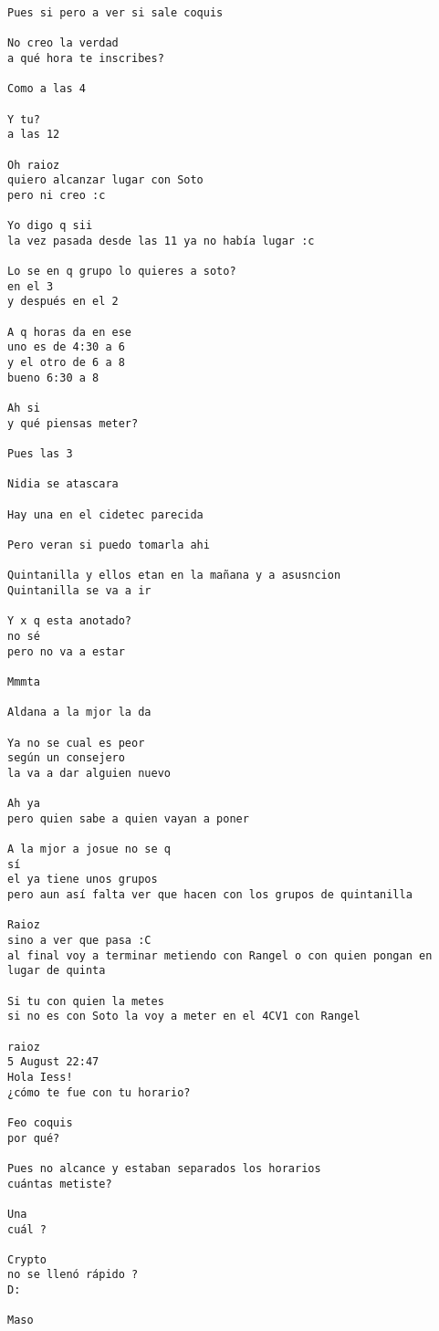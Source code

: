 \begin{verbatim}
Pues si pero a ver si sale coquis

No creo la verdad
a qué hora te inscribes?

Como a las 4

Y tu?
a las 12

Oh raioz
quiero alcanzar lugar con Soto
pero ni creo :c

Yo digo q sii
la vez pasada desde las 11 ya no había lugar :c

Lo se en q grupo lo quieres a soto?
en el 3
y después en el 2

A q horas da en ese
uno es de 4:30 a 6
y el otro de 6 a 8
bueno 6:30 a 8

Ah si
y qué piensas meter?

Pues las 3

Nidia se atascara

Hay una en el cidetec parecida

Pero veran si puedo tomarla ahi

Quintanilla y ellos etan en la mañana y a asusncion
Quintanilla se va a ir

Y x q esta anotado?
no sé
pero no va a estar

Mmmta

Aldana a la mjor la da

Ya no se cual es peor
según un consejero
la va a dar alguien nuevo

Ah ya
pero quien sabe a quien vayan a poner

A la mjor a josue no se q
sí
el ya tiene unos grupos
pero aun así falta ver que hacen con los grupos de quintanilla

Raioz
sino a ver que pasa :C
al final voy a terminar metiendo con Rangel o con quien pongan en lugar de quinta

Si tu con quien la metes
si no es con Soto la voy a meter en el 4CV1 con Rangel

raioz
5 August 22:47
Hola Iess!
¿cómo te fue con tu horario?

Feo coquis
por qué?

Pues no alcance y estaban separados los horarios
cuántas metiste?

Una
cuál ?

Crypto
no se llenó rápido ?
D:

Maso
\end{verbatim}
